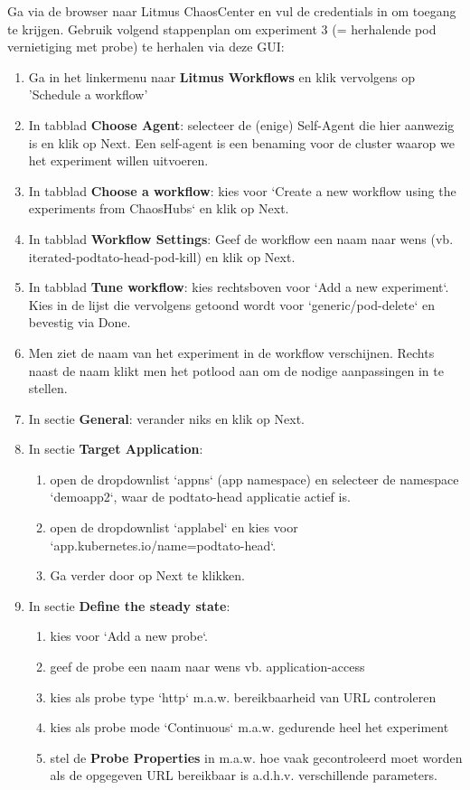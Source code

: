 Ga via de browser naar Litmus ChaosCenter en vul de credentials in om toegang te krijgen. Gebruik volgend stappenplan om experiment 3 (= herhalende pod vernietiging met probe) te herhalen via deze GUI:
\begin{enumerate}
    \item Ga in het linkermenu naar {\bf Litmus Workflows} en klik vervolgens op 'Schedule a workflow'
    \item In tabblad {\bf Choose Agent}: selecteer de (enige) Self-Agent die hier aanwezig is en klik op Next. Een self-agent is een benaming voor de cluster waarop we het experiment willen uitvoeren.
    \item In tabblad {\bf Choose a workflow}: kies voor `Create a new workflow using the experiments from ChaosHubs` en klik op Next.
    \item In tabblad {\bf Workflow Settings}: Geef de workflow een naam naar wens (vb. iterated-podtato-head-pod-kill) en klik op Next.
    \item In tabblad {\bf Tune workflow}: kies rechtsboven voor `Add a new experiment`. Kies in de lijst die vervolgens getoond wordt voor `generic/pod-delete` en bevestig via Done.
    \item Men ziet de naam van het experiment in de workflow verschijnen. Rechts naast de naam klikt men het potlood aan om de nodige aanpassingen in te stellen.
    \item In sectie {\bf General}: verander niks en klik op Next.
    \item In sectie {\bf Target Application}:
        \begin{enumerate}
            \item open de dropdownlist `appns` (app namespace) en selecteer de namespace `demoapp2`, waar de podtato-head applicatie actief is.
            \item open de dropdownlist `applabel` en kies voor `app.kubernetes.io/name=podtato-head`.
            \item Ga verder door op Next te klikken.
        \end{enumerate}
    \item In sectie {\bf Define the steady state}:
        \begin{enumerate}
            \item kies voor `Add a new probe`.
            \item geef de probe een naam naar wens vb. application-access
            \item kies als probe type `http` m.a.w. bereikbaarheid van URL controleren
            \item kies als probe mode `Continuous` m.a.w. gedurende heel het experiment
            \item stel de {\bf Probe Properties} in m.a.w. hoe vaak gecontroleerd moet worden als de opgegeven URL bereikbaar is a.d.h.v. verschillende parameters.
            

\end{enumerate}
\end{enumerate}

